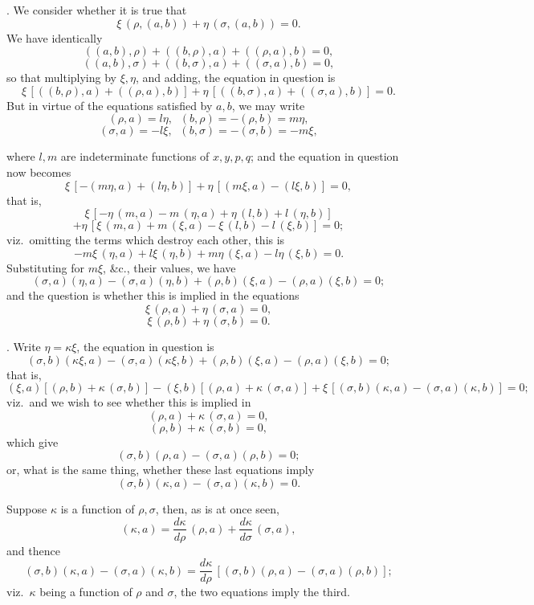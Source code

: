 \documentclass[11pt,a4paper]{article}
\begin{document}
\medskip

. We consider whether it is true that
\[
\xi\,(\rho, (a, b)) + \eta\,(\sigma, (a, b)) = 0.
\]
We have identically
\[
((a, b), \rho) + ((b, \rho), a) + ((\rho, a), b) = 0,
\]
\[
((a, b), \sigma) + ((b, \sigma), a) + ((\sigma, a), b) = 0,
\]
so that multiplying by $\xi, \eta$, and adding, the equation in question is
\[
\xi\,[((b, \rho), a) + ((\rho, a), b)] + \eta\,[((b, \sigma), a) + ((\sigma, a), b)] = 0.
\]
But in virtue of the equations satisfied by $a, b$, we may write
\[
(\rho, a) = l\eta, \;\; (b, \rho) = - (\rho, b) = m\eta,
\]
\[
(\sigma, a) = -l\xi, \;\; (b, \sigma) = - (\sigma, b) = -m\xi,
\]

\newpage


where $l, m$ are indeterminate functions of $x, y, p, q$; and the equation in question now becomes
\[
\xi\,[-(m\eta, a) + (l\eta, b)] + \eta\,[(m\xi, a) - (l\xi, b)] = 0,
\]
that is,
\[
\xi\,[-\eta\,(m, a) - m\,(\eta, a) + \eta\,(l, b) + l\,(\eta, b)]
\]
\[
+ \eta\,[\xi\,(m, a) + m\,(\xi, a) - \xi\,(l, b) - l\,(\xi, b)] = 0;
\]
viz.\ omitting the terms which destroy each other, this is
\[
- m\xi\,(\eta, a) + l\xi\,(\eta, b) + m\eta\,(\xi, a) - l\eta\,(\xi, b) = 0.
\]
Substituting for $m\xi$, \&c., their values, we have
\[
(\sigma, a)(\eta, a) - (\sigma, a)(\eta, b) + (\rho, b)(\xi, a) - (\rho, a)(\xi, b) = 0;
\]
and the question is whether this is implied in the equations
\[
\xi\,(\rho, a) + \eta\,(\sigma, a) = 0,
\]
\[
\xi\,(\rho, b) + \eta\,(\sigma, b) = 0.
\]

\medskip

. Write $\eta = \kappa\xi$, the equation in question is
\[
(\sigma, b)(\kappa\xi, a) - (\sigma, a)(\kappa\xi, b) + (\rho, b)(\xi, a) - (\rho, a)(\xi, b) = 0;
\]
that is,
\[
(\xi, a)[(\rho, b) + \kappa\,(\sigma, b)] - (\xi, b)[(\rho, a) + \kappa\,(\sigma, a)] + \xi\,[(\sigma, b)(\kappa, a) - (\sigma, a)(\kappa, b)] = 0;
\]
viz.\ and we wish to see whether this is implied in
\[
(\rho, a) + \kappa\,(\sigma, a) = 0,
\]
\[
(\rho, b) + \kappa\,(\sigma, b) = 0,
\]
which give
\[
(\sigma, b)(\rho, a) - (\sigma, a)(\rho, b) = 0;
\]
or, what is the same thing, whether these last equations imply
\[
(\sigma, b)(\kappa, a) - (\sigma, a)(\kappa, b) = 0.
\]

Suppose $\kappa$ is a function of $\rho, \sigma$, then, as is at once seen,
\[
(\kappa, a) = \frac{d\kappa}{d\rho}\,(\rho, a) + \frac{d\kappa}{d\sigma}\,(\sigma, a),
\]
and thence
\[
(\sigma, b)(\kappa, a) - (\sigma, a)(\kappa, b) = \frac{d\kappa}{d\rho}\,[(\sigma, b)(\rho, a) - (\sigma, a)(\rho, b)];
\]
viz.\ $\kappa$ being a function of $\rho$ and $\sigma$, the two equations imply the third.
\end{document}
